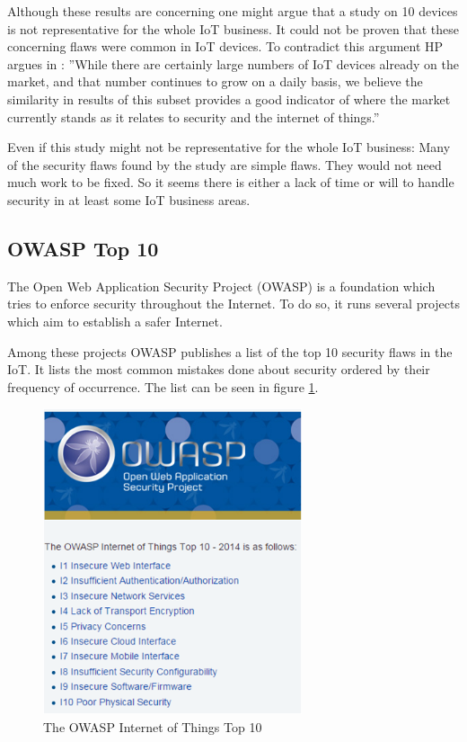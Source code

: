 \documentclass[conference]{IEEEtran}
\begin{document}
Although these results are concerning one might argue that a study on 10 
devices is not representative for the whole IoT business. It could not be 
proven that these concerning flaws were common in IoT devices. To contradict 
this argument HP argues in \cite[p. 6]{HPstudy}: ''While there are certainly 
large numbers of IoT devices already on the market, and that number continues 
to grow on a daily basis, we believe the similarity in results of this subset 
provides a good indicator of where the market currently stands as it relates to 
security and the internet of things.'' 

Even if this study might not be representative for the whole IoT business: Many 
of the security flaws found by the study are simple flaws. They would not need 
much work to be fixed. So it seems there is either a lack of time or will to 
handle security in at least some IoT business areas.

\subsection{OWASP Top 10}
The Open Web Application Security Project (OWASP) is a foundation which tries 
to enforce security throughout the Internet. To do so, it runs several projects 
which aim to establish a safer Internet. 

Among these projects OWASP publishes a list of the top 10 security flaws in the 
IoT. It lists the most common mistakes done about security ordered by their 
frequency of occurrence. The list can be seen in figure \ref{owaspTop10}. 

\begin{figure}[!t]
\centering
\includegraphics[width=3.0in]{./img/owaspTop10.png}
\caption{The OWASP Internet of Things Top 10}
\label{owaspTop10}
\end{figure}
\end{document}
